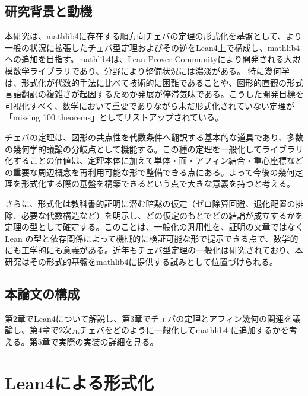 \documentclass[a4paper,12pt]{bxjsbook}
\newlength{\customindent}
\newenvironment{body}{
  \par
  \begingroup
  \setlength{\leftskip}{\customindent}
  \setlength{\rightskip}{0pt}
  \setlength{\parindent}{1em}
  \setlength{\displayindent}{\customindent}
  \setlength{\displaywidth}{\dimexpr\linewidth-\customindent\relax}
}{
  \par
  \endgroup
}
\theoremstyle{theorem}
\begin{document}
    \section{研究背景と動機}
    \begin{body}
      \indent 本研究は、mathlib4に存在する順方向チェバの定理の形式化を基盤として、より一般の状況に拡張したチェバ型定理およびその逆をLean4上で構成し、mathlib4への追加を目指す。mathlib4は、Lean Prover Communityにより開発される大規模数学ライブラリ\cite{LeanProverCommunity}であり、分野により整備状況には濃淡がある。
      特に幾何学は、形式化が代数的手法に比べて技術的に困難であることや、図形的直観の形式言語翻訳の複雑さが起因するためか発展が停滞気味である。こうした開発目標を可視化すべく、数学において重要でありながら未だ形式化されていない定理が「missing 100 theorems」としてリストアップされている。

      \indent チェバの定理は、図形の共点性を代数条件へ翻訳する基本的な道具であり、多数の幾何学的議論の分岐点として機能する。この種の定理を一般化してライブラリ化することの価値は、定理本体に加えて単体・面・アフィン結合・重心座標などの重要な周辺概念を再利用可能な形で整備できる点にある。よって今後の幾何定理を形式化する際の基盤を構築できるという点で大きな意義を持つと考える。

      \indent さらに、形式化は教科書的証明に潜む暗黙の仮定（ゼロ除算回避、退化配置の排除、必要な代数構造など）を明示し、どの仮定のもとでどの結論が成立するかを定理の型として確定する。このことは、一般化の汎用性を、証明の文章ではなく Lean の型と依存関係によって機械的に検証可能な形で提示できる点で、数学的にも工学的にも意義がある。近年もチェバ型定理の一般化は研究されており、本研究はその形式的基盤をmathlib4に提供する試みとして位置づけられる。

    \end{body}

    \section{本論文の構成}
    \begin{body}
        \indent  第$2$章でLean4について解説し、第$3$章でチェバの定理とアフィン幾何の関連を議論し、第$4$章で$2$次元チェバをどのように一般化してmathlib4 に追加するかを考える。第$5$章で実際の実装の詳細を見る。
    \end{body}


    \chapter{Lean4による形式化}
\end{document}
